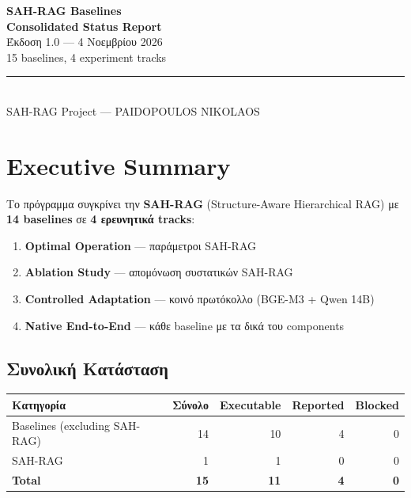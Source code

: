 \documentclass[11pt,a4paper]{article}
\begin{document}
\begin{center}
\vspace*{1.5cm}
{\LARGE\bfseries SAH-RAG Baselines}\\[6pt]
{\LARGE\bfseries Consolidated Status Report}\\[12pt]
{\large Έκδοση 1.0 --- 4 Νοεμβρίου 2026}\\[4pt]
{\normalsize 15 baselines, 4 experiment tracks}\\[20pt]
\rule{\linewidth}{0.4pt}\\[12pt]
{\large SAH-RAG Project --- PAIDOPOULOS NIKOLAOS}\\
\vspace*{1.5cm}
\end{center}

\tableofcontents
\newpage

\section{Executive Summary}

Το πρόγραμμα συγκρίνει την \textbf{SAH-RAG} (Structure-Aware Hierarchical RAG)
με \textbf{14 baselines} σε \textbf{4 ερευνητικά tracks}:

\begin{enumerate}[nosep]
  \item \textbf{Optimal Operation} --- παράμετροι SAH-RAG
  \item \textbf{Ablation Study} --- απομόνωση συστατικών SAH-RAG
  \item \textbf{Controlled Adaptation} --- κοινό πρωτόκολλο (BGE-M3 + Qwen 14B)
  \item \textbf{Native End-to-End} --- κάθε baseline με τα δικά του components
\end{enumerate}

\subsection*{Συνολική Κατάσταση}

\begin{center}
\small
\begin{tabular}{@{}lrrrr@{}}
\toprule
\textbf{Κατηγορία} & \textbf{Σύνολο} & \textbf{Executable} & \textbf{Reported} & \textbf{Blocked} \\
\midrule
Baselines (excluding SAH-RAG) & 14 & 10 & 4 & 0 \\
SAH-RAG & 1 & 1 & 0 & 0 \\
\midrule
\textbf{Total} & \textbf{15} & \textbf{11} & \textbf{4} & \textbf{0} \\
\bottomrule
\end{tabular}
\end{center}
\end{document}
